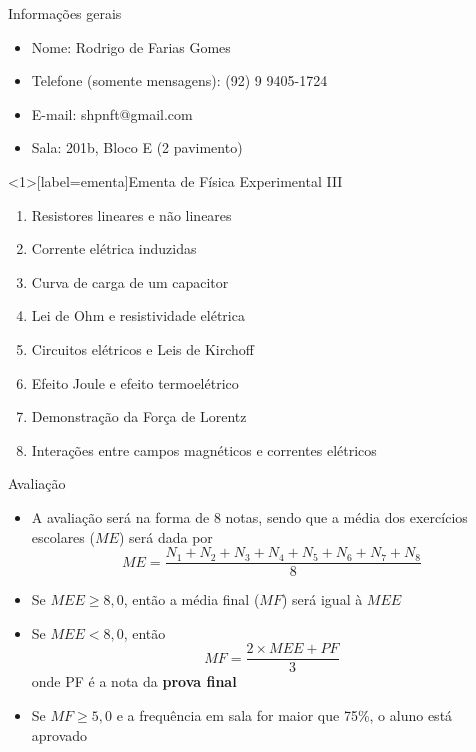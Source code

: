 \documentclass[t,%
brazilian,%
11pt,%
aspectratio=169,%
table%
]{beamer}
\title{\Disciplina}
\author{\Professor}
\date{\Periodo}
\newcommand{\esimo}{\textordmasculine }
\def\Disciplina{Física Experimental III}
\begin{document}
\begin{frame}
    \titlepage
\end{frame}

\begin{frame}{Informações gerais}
    \begin{itemize}
        \item Nome: {\selectfont Rodrigo de Farias Gomes}
        \item Telefone (somente mensagens): (92) 9 9405-1724
        \item E-mail: shpnft@gmail.com
        \item Sala: 201b, Bloco E (2\esimo{} pavimento)
    \end{itemize}
\end{frame}

\begin{frame}<1>[label=ementa]{Ementa de \Disciplina}
    \begin{enumerate}
        \item Resistores lineares e não lineares
        \item Corrente elétrica induzidas
        \item Curva de carga de um capacitor
        \item Lei de Ohm e resistividade elétrica
        \item Circuitos elétricos e Leis de Kirchoff
        \item Efeito Joule e efeito termoelétrico
        \item Demonstração da Força de Lorentz
        \item Interações entre campos magnéticos e correntes elétricos
    \end{enumerate}
\end{frame}

\begin{frame}{Avaliação}
    \begin{itemize}
        \item A avaliação será na forma de 8 notas, sendo que a média dos 
            exercícios escolares (\(ME\)) será dada por
            \[
                ME=\frac{N_1+N_2+N_3+N_4+N_5+N_6+N_7+N_8}{8}
            \]
        \item Se \(MEE \geq 8,0\), então a média final (\(MF\)) será igual à \(MEE\)
        \item Se \(MEE < 8,0\), então
            \[
                MF=\frac{2\times MEE+PF}{3}
            \]
            onde PF é a nota da \textbf{prova final}
        \item Se \(MF \geq 5,0\) e a frequência em sala for maior que 75\%, o aluno está aprovado
    \end{itemize}
\end{frame}
\end{document}
